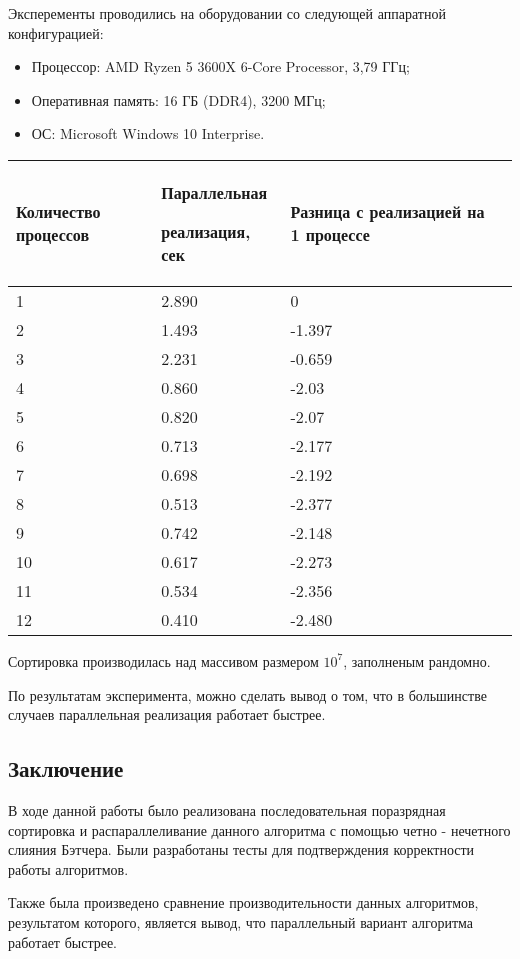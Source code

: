 \documentclass{report}
\begin{document}
Эксперементы проводились на оборудовании со следующей аппаратной конфигурацией:
\begin{itemize}
\item Процессор: AMD Ryzen 5 3600X 6-Core Processor, 3,79 ГГц;
\item Оперативная память: 16 ГБ (DDR4), 3200 МГц;
\item ОС: Microsoft Windows 10 Interprise.
\end{itemize}
\begin{table}[h]
    \begin{tabular}{ | p{4cm} | p{4cm} | p{4cm} | p{4cm} | }
    \hline
    Количество процессов & Параллельная \par реализация, сек & Разница с реализацией на 1 процессе\\ \hline
    1    & 2.890  &0 \\ \hline
    2    & 1.493  &-1.397 \\ \hline
    3    & 2.231  &-0.659 \\ \hline
    4    & 0.860  &-2.03 \\ \hline
    5    & 0.820  &-2.07 \\ \hline 
    6    & 0.713  &-2.177 \\ \hline
    7    & 0.698  &-2.192 \\ \hline
    8    & 0.513  &-2.377 \\ \hline
    9    & 0.742  &-2.148 \\ \hline
    10   & 0.617  &-2.273 \\ \hline
    11   & 0.534  &-2.356 \\ \hline
    12   & 0.410  &-2.480 \\ \hline
    \end{tabular}
\end{table}
\par Сортировка производилась над массивом размером $10^7$, заполненым рандомно.
\par По результатам эксперимента, можно сделать вывод о том, что в большинстве случаев параллельная реализация работает быстрее.

\newpage
\begin{center}
\section*{Заключение}
\end{center}

В ходе данной работы было реализована последовательная поразрядная сортировка и распараллеливание данного алгоритма с помощью четно - нечетного слияния Бэтчера. Были разработаны тесты для подтверждения корректности работы алгоритмов.
\par Также была произведено сравнение производительности данных алгоритмов, результатом которого, является вывод, что параллельный вариант алгоритма работает быстрее.
\end{document}
